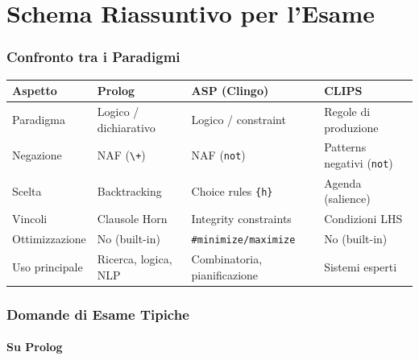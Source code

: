 \documentclass[12pt,a4paper]{article}
\begin{document}
\part{Schema Riassuntivo per l'Esame}

\section{Confronto tra i Paradigmi}

\begin{center}
\renewcommand{\arraystretch}{1.4}
\begin{tabular}{p{3cm}p{3.8cm}p{3.8cm}p{3.8cm}}
\toprule
\textbf{Aspetto} & \textbf{Prolog} & \textbf{ASP (Clingo)} & \textbf{CLIPS} \\
\midrule
Paradigma & Logico / dichiarativo & Logico / constraint & Regole di produzione \\
Negazione & NAF (\texttt{\textbackslash+}) & NAF (\texttt{not}) & Patterns negativi (\texttt{not}) \\
Scelta & Backtracking & Choice rules \texttt{\{h\}} & Agenda (salience) \\
Vincoli & Clausole Horn & Integrity constraints & Condizioni LHS \\
Ottimizzazione & No (built-in) & \texttt{\#minimize/maximize} & No (built-in) \\
Uso principale & Ricerca, logica, NLP & Combinatoria, pianificazione & Sistemi esperti \\
\bottomrule
\end{tabular}
\end{center}

\section{Domande di Esame Tipiche}

\subsection{Su Prolog}
\end{document}
